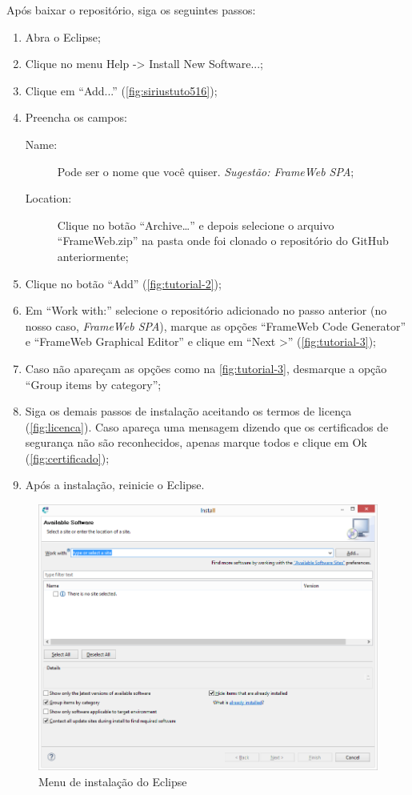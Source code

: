 \documentclass[
article,			%
11pt,				%
oneside,			%
a4paper,			%
english,			%
brazil,				%
sumario=tradicional
]{abntex2}
\begin{document}
Após baixar o repositório, siga os seguintes passos:
\begin{enumerate}
	\item Abra o Eclipse;
	\item Clique no menu Help -> Install New Software...;
	\item Clique em ``Add...'' (\autoref{fig:siriustuto516});
	\item Preencha os campos:
	\begin{description}
		\item[Name:] Pode ser o nome que você quiser. \textit{Sugestão: FrameWeb SPA};
		\item[Location:] Clique no botão ``Archive…'' e depois selecione o arquivo ``FrameWeb.zip'' na pasta onde foi clonado o repositório do GitHub anteriormente;
	\end{description}
	\item Clique no botão ``Add'' (\autoref{fig:tutorial-2});
	\item Em ``Work with:'' selecione o repositório adicionado no passo anterior (no nosso caso, \textit{FrameWeb SPA}), marque as opções ``FrameWeb Code Generator'' e ``FrameWeb Graphical Editor'' e clique em ``Next >'' (\autoref{fig:tutorial-3});
	\item Caso não apareçam as opções como na \autoref{fig:tutorial-3}, desmarque a opção ``Group items by category'';
	\item Siga os demais passos de instalação aceitando os termos de licença (\autoref{fig:licenca}). Caso apareça uma mensagem dizendo que os certificados de segurança não são reconhecidos, apenas marque todos e clique em Ok (\autoref{fig:certificado});
	\item Após a instalação, reinicie o Eclipse.
\end{enumerate}

\begin{figure}
	\centering
	\includegraphics[width=0.7\linewidth]{figuras/Sirius_tuto5_16}
	\caption{Menu de instalação do Eclipse}
	\label{fig:siriustuto516}
\end{figure}
\end{document}
